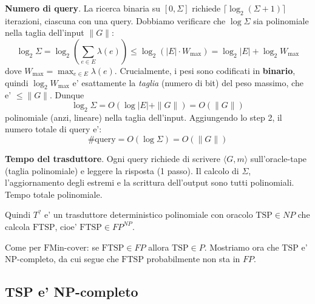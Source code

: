 {  \textbf{Numero di query}. La ricerca binaria su $[0, \Sigma]$ richiede $\lceil \log_2(\Sigma + 1)\rceil$ iterazioni, ciascuna con una query. Dobbiamo verificare che $\log \Sigma$ sia polinomiale nella taglia dell'input $\|G\|$:
  \[
    \log_2 \Sigma = \log_2 \!\left(\sum_{e \in E} \lambda(e)\right) \leq \log_2 (|E| \cdot W_{\max}) = \log_2 |E| + \log_2 W_{\max}
  \]
  dove $W_{\max} = \max_{e \in E} \lambda(e)$. Crucialmente, i pesi sono codificati in \textbf{binario}, quindi $\log_2 W_{\max}$ e' esattamente la \textit{taglia} (numero di bit) del peso massimo, che e' $\leq \|G\|$. Dunque
  \[
    \log_2 \Sigma = O(\log |E| + \|G\|) = O(\|G\|)
  \]
  polinomiale (anzi, lineare) nella taglia dell'input. Aggiungendo lo step 2, il numero totale di query e':
  \[
    \#\text{query} = O(\log \Sigma) = O(\|G\|)
  \]

  \textbf{Tempo del trasduttore}. Ogni query richiede di scrivere $\langle G, m\rangle$ sull'oracle-tape (taglia polinomiale) e leggere la risposta (1 passo). Il calcolo di $\Sigma$, l'aggiornamento degli estremi e la scrittura dell'output sono tutti polinomiali. Tempo totale polinomiale.

  Quindi $T^?$ e' un trasduttore deterministico polinomiale con oracolo $\text{TSP} \in NP$ che calcola $\text{FTSP}$, cioe' $\text{FTSP} \in FP^{NP}$.
}


Come per $\text{FMin-cover}$: se $\text{FTSP} \in FP$ allora $\text{TSP} \in P$. Mostriamo ora che $\text{TSP}$ e' NP-completo, da cui segue che $\text{FTSP}$ probabilmente non sta in $FP$.

\subsection{TSP e' NP-completo}


